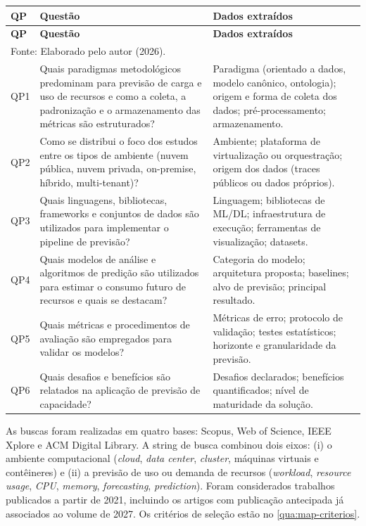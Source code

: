{\footnotesize
\setlength{\tabcolsep}{4pt}
\renewcommand{\arraystretch}{1.2}
\begin{longtable}{p{1.1cm}p{7.4cm}p{6.4cm}}
\toprule
\textbf{QP} & \textbf{Questão} & \textbf{Dados extraídos} \\
\midrule
\endfirsthead
\toprule
\textbf{QP} & \textbf{Questão} & \textbf{Dados extraídos} \\
\midrule
\endhead
\bottomrule
\multicolumn{3}{l}{Fonte: Elaborado pelo autor (2026).}\\
\endlastfoot
QP1 & Quais paradigmas metodológicos predominam para previsão de carga e uso de recursos e como a coleta, a padronização e o armazenamento das métricas são estruturados? & Paradigma (orientado a dados, modelo canônico, ontologia); origem e forma de coleta dos dados; pré-processamento; armazenamento. \\
QP2 & Como se distribui o foco dos estudos entre os tipos de ambiente (nuvem pública, nuvem privada, on-premise, híbrido, multi-tenant)? & Ambiente; plataforma de virtualização ou orquestração; origem dos dados (traces públicos ou dados próprios). \\
QP3 & Quais linguagens, bibliotecas, frameworks e conjuntos de dados são utilizados para implementar o pipeline de previsão? & Linguagem; bibliotecas de ML/DL; infraestrutura de execução; ferramentas de visualização; datasets. \\
QP4 & Quais modelos de análise e algoritmos de predição são utilizados para estimar o consumo futuro de recursos e quais se destacam? & Categoria do modelo; arquitetura proposta; baselines; alvo de previsão; principal resultado. \\
QP5 & Quais métricas e procedimentos de avaliação são empregados para validar os modelos? & Métricas de erro; protocolo de validação; testes estatísticos; horizonte e granularidade da previsão. \\
QP6 & Quais desafios e benefícios são relatados na aplicação de previsão de capacidade? & Desafios declarados; benefícios quantificados; nível de maturidade da solução. \\
\end{longtable}
}

As buscas foram realizadas em quatro bases: Scopus, Web of Science, IEEE Xplore e ACM Digital Library. A string de busca combinou dois eixos: (i) o ambiente computacional (\textit{cloud}, \textit{data center}, \textit{cluster}, máquinas virtuais e contêineres) e (ii) a previsão de uso ou demanda de recursos (\textit{workload}, \textit{resource usage}, \textit{CPU}, \textit{memory}, \textit{forecasting}, \textit{prediction}).
Foram considerados trabalhos publicados a partir de 2021, incluindo os artigos com publicação antecipada já associados ao volume de 2027. Os critérios de seleção estão no \autoref{qua:map-criterios}.

